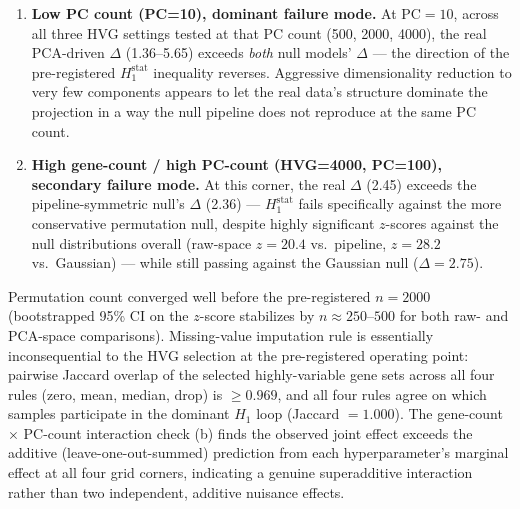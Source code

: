 \begin{enumerate}
\item \textbf{Low PC count (PC=10), dominant failure mode.} At PC$=10$, across all three HVG settings tested at that PC count (500, 2000, 4000), the real PCA-driven $\Delta$ (1.36--5.65) exceeds \emph{both} null models' $\Delta$ --- the direction of the pre-registered $H_1^{\text{stat}}$ inequality reverses. Aggressive dimensionality reduction to very few components appears to let the real data's structure dominate the projection in a way the null pipeline does not reproduce at the same PC count.
\item \textbf{High gene-count / high PC-count (HVG=4000, PC=100), secondary failure mode.} At this corner, the real $\Delta$ (2.45) exceeds the pipeline-symmetric null's $\Delta$ (2.36) --- $H_1^{\text{stat}}$ fails specifically against the more conservative permutation null, despite highly significant $z$-scores against the null distributions overall (raw-space $z=20.4$ vs.\ pipeline, $z=28.2$ vs.\ Gaussian) --- while still passing against the Gaussian null ($\Delta=2.75$).
\end{enumerate}

Permutation count converged well before the pre-registered $n=2000$ (bootstrapped 95\% CI on the $z$-score stabilizes by $n\approx250$--$500$ for both raw- and PCA-space comparisons). Missing-value imputation rule is essentially inconsequential to the HVG selection at the pre-registered operating point: pairwise Jaccard overlap of the selected highly-variable gene sets across all four rules (zero, mean, median, drop) is $\geq0.969$, and all four rules agree on which samples participate in the dominant $H_1$ loop (Jaccard $=1.000$). The gene-count $\times$ PC-count interaction check (b) finds the observed joint effect exceeds the additive (leave-one-out-summed) prediction from each hyperparameter's marginal effect at all four grid corners, indicating a genuine superadditive interaction rather than two independent, additive nuisance effects.

